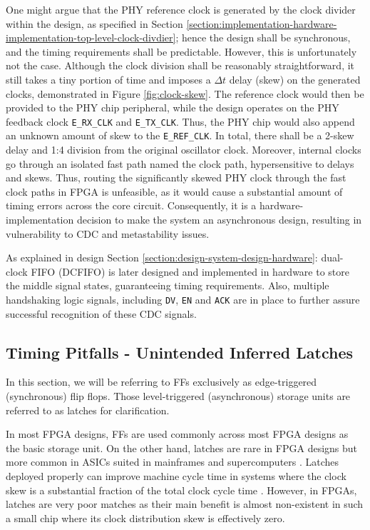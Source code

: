 \documentclass[a4paper]{report}
\newcommand{\code}{\texttt}
\begin{document}
One might argue that the PHY reference clock is generated by the clock divider within the design, as specified in Section \ref{section:implementation-hardware-implementation-top-level-clock-divdier}; hence the design shall be synchronous, and the timing requirements shall be predictable. However, this is unfortunately not the case. Although the clock division shall be reasonably straightforward, it still takes a tiny portion of time and imposes a $\Delta t$ delay (skew) on the generated clocks, demonstrated in Figure \ref{fig:clock-skew}. The reference clock would then be provided to the PHY chip peripheral, while the design operates on the PHY feedback clock \code{E\_RX\_CLK} and \code{E\_TX\_CLK}. Thus, the PHY chip would also append an unknown amount of skew to the \code{E\_REF\_CLK}. In total, there shall be a 2-skew delay and 1:4 division from the original oscillator clock. Moreover, internal clocks go through an isolated fast path named the clock path, hypersensitive to delays and skews. Thus, routing the significantly skewed PHY clock through the fast clock paths in FPGA is unfeasible, as it would cause a substantial amount of timing errors across the core circuit. Consequently, it is a hardware-implementation decision to make the system an asynchronous design, resulting in vulnerability to CDC and metastability issues.
 
As explained in design Section \ref{section:design-system-design-hardware}: dual-clock FIFO (DCFIFO) is later designed and implemented in hardware to store the middle signal states, guaranteeing timing requirements. Also, multiple handshaking logic signals, including \code{DV}, \code{EN} and \code{ACK} are in place to further assure successful recognition of these CDC signals.

\subsection{Timing Pitfalls - Unintended Inferred Latches}

In this section, we will be referring to FFs exclusively as edge-triggered (synchronous) flip flops. Those level-triggered (asynchronous) storage units are referred to as latches for clarification.

In most FPGA designs, FFs are used commonly across most FPGA designs as the basic storage unit. On the other hand, latches are rare in FPGA designs but more common in ASICs suited in mainframes and supercomputers \cite{vasumathi-2018}. Latches deployed properly can improve machine cycle time in systems where the clock skew is a substantial fraction of the total clock cycle time \cite{vasumathi-2018}. However, in FPGAs, latches are very poor matches as their main benefit is almost non-existent in such a small chip where its clock distribution skew is effectively zero.
\end{document}
